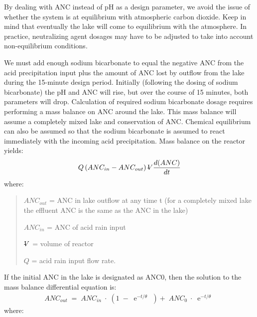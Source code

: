 \documentclass[letterpaper,10pt,english]{sphinxmanual}
\begin{document}
By dealing with ANC instead of pH as a design parameter, we avoid the issue of whether the system is at equilibrium with atmospheric carbon dioxide. Keep in mind that eventually the lake will come to equilibrium with the atmosphere. In practice, neutralizing agent dosages may have to be adjusted to take into account non-equilibrium conditions.

We must add enough sodium bicarbonate to equal the negative ANC from the acid precipitation input plus the amount of ANC lost by outflow from the lake during the 15-minute design period. Initially (following the dosing of sodium bicarbonate) the pH and ANC will rise, but over the course of 15 minutes, both parameters will drop. Calculation of required sodium bicarbonate dosage requires performing a mass balance on ANC around the lake. This mass balance will assume a completely mixed lake and conservation of ANC. Chemical equilibrium can also be assumed so that the sodium bicarbonate is assumed to react immediately with the incoming acid precipitation. Mass balance on the reactor yields:
\begin{equation}\label{equation:Acid_Rain/Acid_Rain:Acid_Rain/Acid_Rain:5}
\begin{split}Q\left(ANC_{in}  - ANC_{out} \right)  \rlap{-} V \frac{d(ANC)}{dt}\end{split}
\end{equation}
where:
\begin{quote}

\begin{DUlineblock}{0em}
\item[] \(ANC_{out}\) = ANC in lake outflow at any time t (for a completely mixed lake the effluent ANC is the same as the ANC in the lake)
\item[] \(ANC_{in}\) = ANC of acid rain input
\item[] \(\rlap{-} V\) = volume of reactor
\item[] \(Q\) = acid rain input flow rate.
\end{DUlineblock}
\end{quote}

If the initial ANC in the lake is designated as ANC0, then the solution to the mass balance differential equation is:
\begin{equation}\label{equation:Acid_Rain/Acid_Rain:Acid_Rain/Acid_Rain:6}
\begin{split}ANC_{out} \; =\; ANC_{in} \; \cdot \; \left(1\; -\; {\mathop{e}\nolimits^{-t/\theta \; \; }} \right)+\; ANC_{0} \; \cdot \; {\mathop{e}\nolimits^{-t/\theta \; }}\end{split}
\end{equation}
where:
\end{document}
